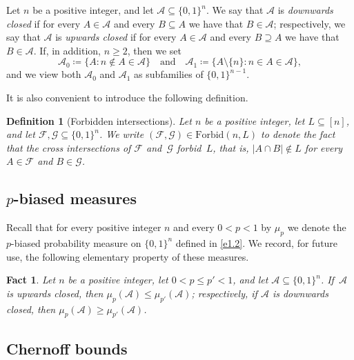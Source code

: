 \documentclass[10pt,a4paper]{amsart}
\newtheorem{fact}[thm]{Fact}
\newtheorem{defn}[thm]{Definition}
\theoremstyle{remark}
\newcommand{\meg}{\geqslant}
\newcommand{\mik}{\leqslant}
\newcommand{\Fcal}{\mathcal{F}}
\newcommand{\Gcal}{\mathcal{G}}
\newcommand{\Acal}{\mathcal{A}}
\begin{document}
Let $n$ be a positive integer, and let $\Acal\subseteq \{0,1\}^n$.
We say that $\Acal$ is \textit{downwards closed} if for every
$A\in\Acal$ and every $B\subseteq A$ we have that $B\in\Acal$; respectively, we say that
$\Acal$ is \textit{upwards closed} if for every $A\in\Acal$ and every $B\supseteq A$
we have that $B\in\Acal$. If, in addition, $n\meg 2$, then we set
\begin{equation} \label{e2.1}
\mathcal{A}_0\coloneqq \{A: n\notin A\in\mathcal{A}\} \ \ \ \text{ and } \ \ \
\mathcal{A}_1\coloneqq \big\{A\setminus \{n\}: n\in A\in\mathcal{A}\big\},
\end{equation}
and we view both $\Acal_0$ and $\Acal_1$ as subfamilies of $\{0,1\}^{n-1}$.

It is also convenient to introduce the following definition.
\begin{defn}[Forbidden intersections] \label{d2.1}
Let $n$ be a positive integer, let $L\subseteq [n]$, and let $\Fcal,\Gcal\subseteq \{0,1\}^n$.
We write $(\Fcal,\Gcal)\in \mathrm{Forbid}(n,L)$ to denote the fact that the cross intersections
of $\Fcal$ and\, $\Gcal$ forbid\, $L$, that is, $|A\cap B|\notin L$ for every $A\in\Fcal$ and $B\in\Gcal$.
\end{defn}

\subsection{$p$-biased measures} \label{subsec2.3}

Recall that for every positive integer $n$ and every $0<p<1$ by $\mu_p$ we
denote the $p$-biased probability measure on $\{0,1\}^n$ defined in \eqref{e1.2}.
We record, for future use, the following elementary property of these measures.
\begin{fact} \label{f2.2}
Let $n$ be a positive integer, let $0<p\mik p'<1$, and let $\Acal\subseteq \{0,1\}^n$.
If~$\Acal$ is upwards closed, then $\mu_p(\Acal)\mik \mu_{p'}(\Acal)$; respectively,
if $\Acal$ is downwards closed, then $\mu_p(\Acal) \meg \mu_{p'}(\Acal)$.
\end{fact}

\subsection{Chernoff bounds} \label{subsec2.4}
\end{document}
